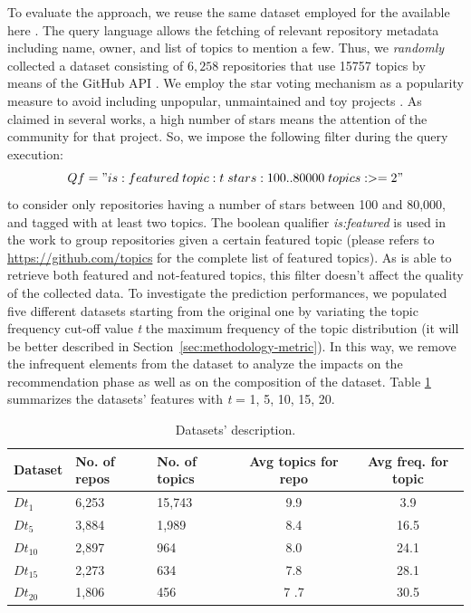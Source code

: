 To evaluate the approach, we reuse the same dataset employed for the \MNB available here \cite{MNBreplication}. The \GH query language \cite{understanding} allows the fetching of relevant repository metadata including name, owner, and list of topics to mention a few. Thus, we \emph{randomly} collected a dataset consisting of $6,258$ repositories that use 15757 topics by means of the GitHub API \cite{pygithub/pygithub_2019}. We employ the \GH star voting mechanism as a popularity measure to avoid including unpopular, unmaintained and toy projects \cite{borges_whats_2018}. As claimed in several works\cite{borges_popularity_2017, borges_predicting_2016}, a high number of stars means the attention of the community for that project. So, we impose the following filter during the query execution:
\begin{equation}
\small
Qf = "is:featured \; topic:t \; stars:100..80000 \; topics:>=2"
\end{equation}%
to consider only \GH repositories having a number of stars between 100 and 80,000, and tagged with at least two topics. The boolean qualifier \emph{is:featured} is used in the \MNB work to group repositories given a certain featured topic (please refers to \url{https://github.com/topics} for the complete list of featured topics). As \CT is able to retrieve both featured and not-featured topics, this filter doesn't affect the quality of the collected data.
To investigate the \CT prediction performances, we populated five different datasets starting from the original one by variating the topic frequency cut-off value \emph{t} \ie the maximum frequency of the topic distribution (it will be better described in Section~\ref{sec:methodology-metric}). In this way, we remove the infrequent elements from the dataset to analyze the impacts on the recommendation phase as well as on the composition of the dataset. Table \ref{tab:datasets} summarizes the datasets' features with \emph{t} = 1, 5, 10, 15, 20.


\begin{table}[h]
\centering


\resizebox{8.5cm}{!} {
\begin{tabular}{|l|l|l|c|c|}
\hline
\textbf{Dataset} & \textbf{No. of repos} &\textbf{ No. of topics} & \textbf{Avg topics for repo} & \textbf{Avg freq. for topic} \\ \hline
$Dt_1$  &       6,253      &    15,743       &  9.9  &  3.9       \\ \hline
 $Dt_5$  &        3,884      &    1,989      &     8.4  &   16.5   \\ \hline
$Dt_{10}$  &    2,897         &      964	     &   8.0    &  24.1 \\ \hline
$Dt_{15}$  &    2,273        &   634       &   7.8  &  28.1       \\ \hline
$Dt_{20}$  &    1,806       &   456        &   7 .7 &  30.5       \\ \hline

\end{tabular}
}
\caption{Datasets' description.}
\label{tab:datasets}
\end{table} 

